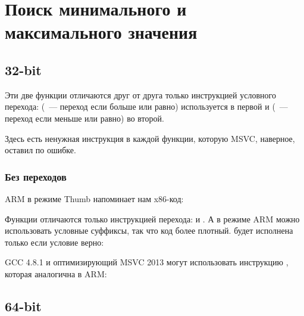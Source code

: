 ﻿\section{Поиск минимального и максимального значения}

\subsection{32-bit}





Эти две функции отличаются друг от друга только инструкцией условного перехода:
 (~--- переход если больше или равно) используется в первой
и  (~--- переход если меньше или равно) во второй.

\myindex{\CompilerAnomaly}
\label{MSVC_double_JMP_anomaly}
Здесь есть ненужная инструкция \JMP в каждой функции, которую MSVC, наверное, оставил по ошибке.

\subsubsection{Без переходов}

ARM в режиме Thumb напоминает нам x86-код:



Функции отличаются только инструкцией перехода:  и .
А в режиме ARM можно использовать условные суффиксы, так что код более плотный.
 будет исполнена только если условие верно:




\Optimizing GCC 4.8.1 и оптимизирующий MSVC 2013 
могут использовать инструкцию , которая аналогична  в ARM:



\subsection{64-bit}

